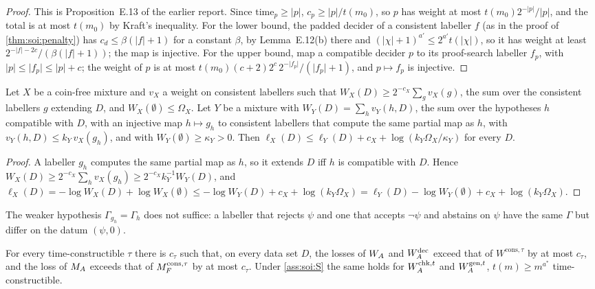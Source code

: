 \begin{proof}
This is Proposition~E.13 of the earlier report. Since $\mathrm{time}_p\ge\lvert p\rvert$, $c_p\ge\lvert p\rvert/t(m_0)$, so $p$ has weight at most $t(m_0)2^{-\lvert p\rvert}/\lvert p\rvert$, and the total is at most $t(m_0)$ by Kraft's inequality. For the lower bound, the padded decider of a consistent labeller $f$ (as in the proof of \cref{thm:soi:penalty}) has $c_d\le\beta(\lvert f\rvert+1)$ for a constant $\beta$, by Lemma~E.12(b) there and $(\lvert\chi\rvert+1)^{a'}\le2^{a'}t(\lvert\chi\rvert)$, so it has weight at least $2^{-\lvert f\rvert-2c}/(\beta(\lvert f\rvert+1))$; the map is injective. For the upper bound, map a compatible decider $p$ to its proof-search labeller $f_p$, with $\lvert p\rvert\le\lvert f_p\rvert\le\lvert p\rvert+c$; the weight of $p$ is at most $t(m_0)(c+2)2^c\,2^{-\lvert f_p\rvert}/(\lvert f_p\rvert+1)$, and $p\mapsto f_p$ is injective.
\end{proof}

\begin{theorem}\label{thm:soi:domination}
Let $X$ be a coin-free mixture and $v_X$ a weight on consistent labellers such that $W_X(D)\ge2^{-c_X}\sum_gv_X(g)$, the sum over the consistent labellers $g$ extending $D$, and $W_X(\emptyset)\le\Omega_X$. Let $Y$ be a mixture with $W_Y(D)=\sum_hv_Y(h,D)$, the sum over the hypotheses $h$ compatible with $D$, with an injective map $h\mapsto g_h$ to consistent labellers that compute the same partial map as $h$, with $v_Y(h,D)\le k_Y\,v_X(g_h)$, and with $W_Y(\emptyset)\ge\kappa_Y>0$. Then $\ell_X(D)\le\ell_Y(D)+c_X+\log(k_Y\Omega_X/\kappa_Y)$ for every $D$.
\end{theorem}

\begin{proof}
A labeller $g_h$ computes the same partial map as $h$, so it extends $D$ iff $h$ is compatible with $D$. Hence $W_X(D)\ge2^{-c_X}\sum_hv_X(g_h)\ge2^{-c_X}k_Y^{-1}W_Y(D)$, and $\ell_X(D)=-\log W_X(D)+\log W_X(\emptyset)\le-\log W_Y(D)+c_X+\log(k_Y\Omega_X)=\ell_Y(D)-\log W_Y(\emptyset)+c_X+\log(k_Y\Omega_X)$.
\end{proof}

The weaker hypothesis $\Gamma_{g_h}=\Gamma_h$ does not suffice: a labeller that rejects $\psi$ and one that accepts $\neg\psi$ and abstains on $\psi$ have the same $\Gamma$ but differ on the datum $(\psi,0)$.

\begin{corollary}\label{cor:soi:onesided}
For every time-constructible $\tau$ there is $c_\tau$ such that, on every data set $D$, the losses of $W_{A}$ and $W_{A}^{\mathrm{dec}}$ exceed that of $W^{\mathrm{cons},\tau}$ by at most $c_\tau$, and the loss of $M_{A}$ exceeds that of $M_{F}^{\mathrm{cons},\tau}$ by at most $c_\tau$. Under \cref{ass:soi:S} the same holds for $W_{A}^{\mathrm{chk},t}$ and $W_{A}^{\mathrm{gen},t}$, $t(m)\ge m^{a^*}$ time-constructible.
\end{corollary}

